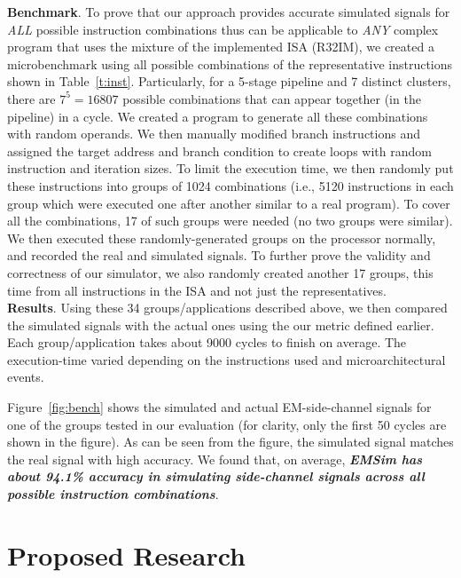 \documentclass[11 pt]{article}
\begin{document}
\noindent\textbf{Benchmark}. To prove that our approach provides accurate simulated signals for \textit{ALL} possible instruction combinations thus can be applicable to \textit{ANY} complex program that uses the mixture of the implemented ISA (R32IM), we created a microbenchmark using all possible combinations of the representative instructions shown in Table~\ref{t:inst}. Particularly, for a 5-stage pipeline and 7 distinct clusters, there are $7^5=16807$ possible combinations that can appear together (in the pipeline) in a cycle. We created a program to generate all these combinations with random operands. We then manually modified branch instructions and assigned the target address and branch condition to create loops with random instruction and iteration sizes.  To limit the execution time, we then randomly put these instructions into groups of 1024 combinations (i.e., 5120 instructions in each group which were executed one after another similar to a real program). To cover all the combinations, 17 of such groups were needed (no two groups were similar). We then executed these randomly-generated groups on the processor normally, and recorded the real and simulated signals. To further prove the validity and correctness of our simulator, we also randomly created another 17 groups, this time from all  instructions in the ISA and not just the representatives. \\

\noindent\textbf{Results}. Using these 34 groups/applications described above, we then compared the simulated signals with the actual ones using the our metric defined earlier. Each group/application takes about 9000 cycles to finish on average. The execution-time varied depending on the instructions used and microarchitectural events.

Figure~\ref{fig:bench} shows the simulated and actual EM-side-channel signals for one of the groups tested in our evaluation (for clarity, only the first 50 cycles are shown in the figure). As can be seen from the figure, the simulated signal matches the real signal with high accuracy. We found that, on average, \textbf{\textit{EMSim has about 94.1\% accuracy in simulating side-channel signals across all possible instruction combinations}}.

\section{Proposed Research}
\end{document}
